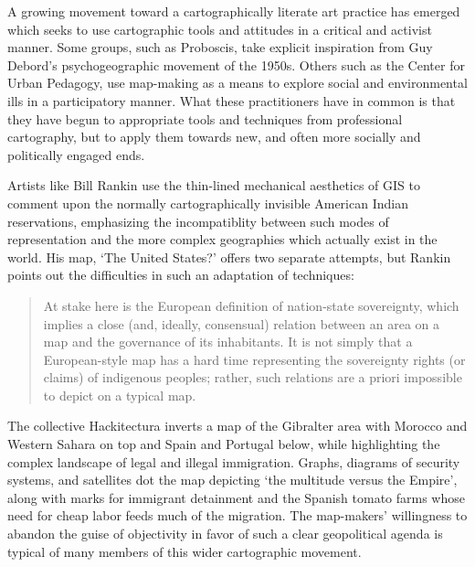 \documentclass[11pt,oneside,notitlepage]{report}
\begin{document}
A growing movement toward a cartographically literate art practice has emerged which seeks to use cartographic tools and attitudes in a critical and activist manner. Some groups, such as Proboscis, take explicit inspiration from Guy Debord's psychogeographic movement of the 1950s. Others such as the Center for Urban Pedagogy, use map-making as a means to explore social and environmental ills in a participatory manner. What these practitioners have in common is that they have begun to appropriate tools and techniques from professional cartography, but to apply them towards new, and often more socially and politically engaged ends. 

Artists like Bill Rankin use the thin-lined mechanical aesthetics of GIS to comment upon the normally cartographically invisible American Indian reservations, emphasizing the incompatiblity between such modes of representation and the more complex geographies which actually exist in the world. His map, `The United States?' offers two separate attempts, but Rankin points out the difficulties in such an adaptation of techniques:

\begin{quote}
At stake here is the European definition of nation-state sovereignty, which implies a close (and, ideally, consensual) relation between an area on a map and the governance of its inhabitants. It is not simply that a European-style map has a hard time representing the sovereignty rights (or claims) of indigenous peoples; rather, such relations are a priori impossible to depict on a typical map. \cite{rankin2003reservations}
\end{quote}

The collective Hackitectura inverts a map of the Gibralter area with Morocco and Western Sahara on top and Spain and Portugal below, while highlighting the complex landscape of legal and illegal immigration. Graphs, diagrams of security systems, and satellites dot the map depicting `the multitude versus the Empire', along with marks for immigrant detainment and the Spanish tomato farms whose need for cheap labor feeds much of the migration. The map-makers' willingness to abandon the guise of objectivity in favor of such a clear geopolitical agenda is typical of many members of this wider cartographic movement.  
\end{document}
